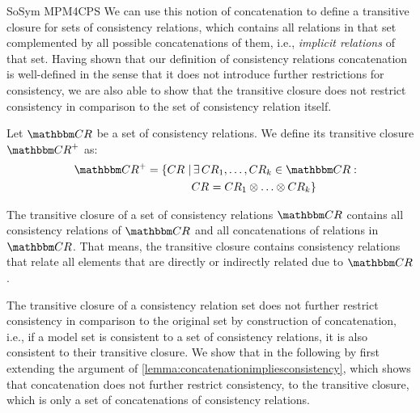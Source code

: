\begin{copiedFrom}{SoSym MPM4CPS}
We can use this notion of concatenation to define a transitive closure for sets of consistency relations, which contains all relations in that set complemented by all possible concatenations of them, i.e., \emph{implicit relations} of that set.
Having shown that our definition of consistency relations concatenation is well-defined in the sense that it does not introduce further restrictions for consistency, we are also able to show that the transitive closure does not restrict consistency in comparison to the set of consistency relation itself.


\begin{definition} \label{def:transitiveclosure}
    Let $\consistencyrelationset{CR}$ be a set of consistency relations.
    We define its transitive closure $\transitiveclosure{\consistencyrelationset{CR}}$ as:
    \begin{align*}
        \formulaskip
        \transitiveclosure{\consistencyrelationset{CR}{}} = \setted{\consistencyrelation{CR}{} \mid & \exists \consistencyrelation{CR}{1}, \dots, \consistencyrelation{CR}{k} \in \consistencyrelationset{CR}{} : \\
        &
        \consistencyrelation{CR}{} = \consistencyrelation{CR}{1} \concat \dots \concat \consistencyrelation{CR}{k} }
    \end{align*}
\end{definition}

The transitive closure of a set of consistency relations $\consistencyrelationset{CR}$ contains all consistency relations of $\consistencyrelationset{CR}$ and all concatenations of relations in $\consistencyrelationset{CR}$. That means, the transitive closure contains consistency relations that relate all elements that are directly or indirectly related due to $\consistencyrelationset{CR}$.

The transitive closure of a consistency relation set does not further restrict consistency in comparison to the original set by construction of concatenation, i.e., if a model set is consistent to a set of consistency relations, it is also consistent to their transitive closure.
We show that in the following by first extending the argument of \autoref{lemma:concatenationimpliesconsistency}, which shows that concatenation does not further restrict consistency, to the transitive closure, which is only a set of concatenations of consistency relations.


\end{copiedFrom}
